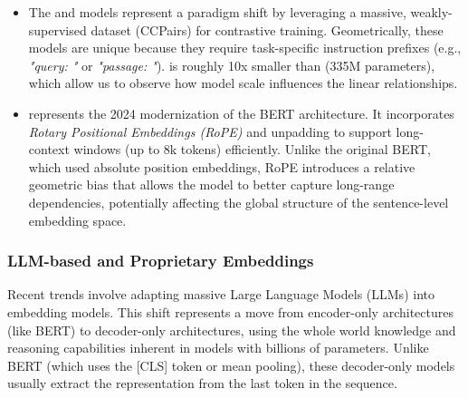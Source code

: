 \begin{itemize}
    \item The \elarge{} and \esmall{} \citep{wang2022text} models represent a paradigm shift by leveraging a massive, weakly-supervised dataset (CCPairs) for contrastive training. Geometrically, these models are unique because they require task-specific instruction prefixes (e.g., \textit{"query: "} or \textit{"passage: "}). %
    \esmall is roughly 10x smaller than \elarge (335M parameters), which allow us to observe how model scale influences the linear relationships.
    \item \modernbert{} \citep{warner-etal-2025-smarter} represents the 2024 modernization of the BERT architecture. It incorporates \textit{Rotary Positional Embeddings (RoPE)} and unpadding to support long-context windows (up to 8k tokens) efficiently. Unlike the original BERT, which used absolute position embeddings, RoPE introduces a relative geometric bias that allows the model to better capture long-range dependencies, potentially affecting the global structure of the sentence-level embedding space.
\end{itemize}

\subsubsection{LLM-based and Proprietary Embeddings}
Recent trends involve adapting massive Large Language Models (LLMs) into embedding models. This shift represents a move from encoder-only architectures (like BERT) to decoder-only architectures, using the whole world knowledge and reasoning capabilities inherent in models with billions of parameters. Unlike BERT (which uses the [CLS] token or mean pooling), these decoder-only models usually extract the representation from the last token in the sequence.


